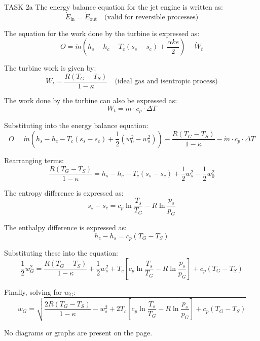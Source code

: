 TASK 2a  
The energy balance equation for the jet engine is written as:  
\[
\dot{E}_{\text{in}} = \dot{E}_{\text{out}} \quad \text{(valid for reversible processes)}
\]  

The equation for the work done by the turbine is expressed as:  
\[
O = \dot{m} \left( h_s - h_c - T_c (s_s - s_c) + \frac{\alpha k e}{2} \right) - \dot{W}_t
\]  

The turbine work is given by:  
\[
\dot{W}_t = \frac{R (T_G - T_S)}{1 - \kappa} \quad \text{(ideal gas and isentropic process)}
\]  

The work done by the turbine can also be expressed as:  
\[
W_t = \dot{m} \cdot c_p \cdot \Delta T
\]  

Substituting into the energy balance equation:  
\[
O = \dot{m} \left( h_s - h_c - T_c (s_s - s_c) + \frac{1}{2} (w_0^2 - w_s^2) \right) - \frac{R (T_G - T_S)}{1 - \kappa} - \dot{m} \cdot c_p \cdot \Delta T
\]  

Rearranging terms:  
\[
\frac{R (T_G - T_S)}{1 - \kappa} = h_s - h_c - T_c (s_s - s_c) + \frac{1}{2} w_s^2 - \frac{1}{2} w_0^2
\]  

The entropy difference is expressed as:  
\[
s_s - s_c = c_p \ln \frac{T_s}{T_G} - R \ln \frac{p_s}{p_G}
\]  

The enthalpy difference is expressed as:  
\[
h_c - h_s = c_p (T_G - T_S)
\]  

Substituting these into the equation:  
\[
\frac{1}{2} w_G^2 = \frac{R (T_G - T_S)}{1 - \kappa} + \frac{1}{2} w_s^2 + T_c \left[ c_p \ln \frac{T_s}{T_G} - R \ln \frac{p_s}{p_G} \right] + c_p (T_G - T_S)
\]  

Finally, solving for \( w_G \):  
\[
w_G = \sqrt{\frac{2 R (T_G - T_S)}{1 - \kappa} - w_s^2 + 2 T_c \left[ c_p \ln \frac{T_s}{T_G} - R \ln \frac{p_s}{p_G} \right] + c_p (T_G - T_S)}
\]  

No diagrams or graphs are present on the page.